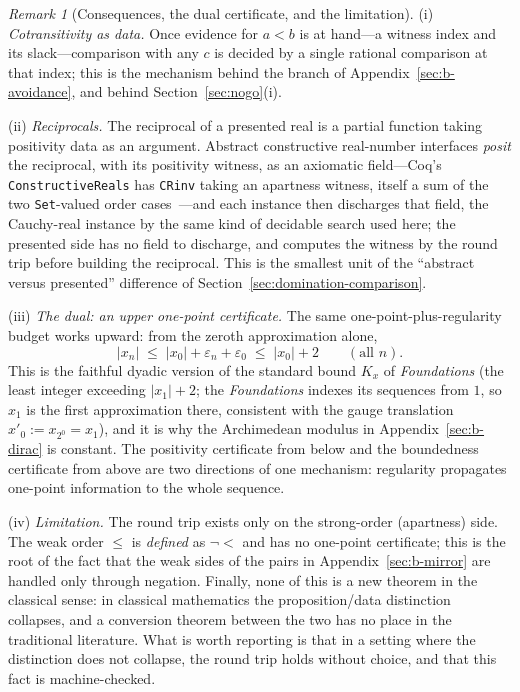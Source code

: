 \documentclass[11pt]{article}
\theoremstyle{definition}
\theoremstyle{remark}
\newtheorem{remark}[theorem]{Remark}
\begin{document}
\begin{remark}[Consequences, the dual certificate, and the limitation]
\label{rem:b-consequences}
(i) \emph{Cotransitivity as data.}  Once evidence for $a<b$ is at hand---a witness index and its slack---comparison with any $c$ is decided by a single rational comparison at that index; this is the mechanism behind the branch of Appendix~\ref{sec:b-avoidance}, and behind Section~\ref{sec:nogo}(i).

(ii) \emph{Reciprocals.}  The reciprocal of a presented real is a partial function taking positivity data as an argument.  Abstract constructive real-number interfaces \emph{posit} the reciprocal, with its positivity witness, as an axiomatic field---Coq's \texttt{ConstructiveReals} has \texttt{CRinv} taking an apartness witness, itself a sum of the two \texttt{Set}-valued order cases~\cite{coq-constructive-reals}---and each instance then discharges that field, the Cauchy-real instance by the same kind of decidable search used here; the presented side has no field to discharge, and computes the witness by the round trip before building the reciprocal.  This is the smallest unit of the ``abstract versus presented'' difference of Section~\ref{sec:domination-comparison}.

(iii) \emph{The dual: an upper one-point certificate.}  The same one-point-plus-regularity budget works upward: from the zeroth approximation alone,
\[
|x_n|\;\le\;|x_0|+\varepsilon_n+\varepsilon_0\;\le\;|x_0|+2\qquad(\text{all } n).
\]
This is the faithful dyadic version of the standard bound $K_x$ of \emph{Foundations} (the least integer exceeding $|x_1|+2$; the \emph{Foundations} indexes its sequences from $1$, so $x_1$ is the first approximation there, consistent with the gauge translation $x'_0:=x_{2^0}=x_1$), and it is why the Archimedean modulus in Appendix~\ref{sec:b-dirac} is constant.  The positivity certificate from below and the boundedness certificate from above are two directions of one mechanism: regularity propagates one-point information to the whole sequence.

(iv) \emph{Limitation.}  The round trip exists only on the strong-order (apartness) side.  The weak order $\le$ is \emph{defined} as $\neg<$ and has no one-point certificate; this is the root of the fact that the weak sides of the pairs in Appendix~\ref{sec:b-mirror} are handled only through negation.  Finally, none of this is a new theorem in the classical sense: in classical mathematics the proposition/data distinction collapses, and a conversion theorem between the two has no place in the traditional literature.  What is worth reporting is that in a setting where the distinction does not collapse, the round trip holds without choice, and that this fact is machine-checked.
\end{remark}
\end{document}
